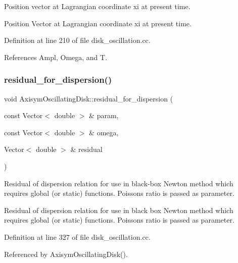 Position vector at Lagrangian coordinate xi at present time. 

Position Vector at Lagrangian coordinate xi at present time. 

Definition at line 210 of file disk\+\_\+oscillation.\+cc.



References Ampl, Omega, and T.

\mbox{\label{classAxisymOscillatingDisk_ae6a90b479781b587bb8905e7bf2bba3b}} 
\subsubsection{\texorpdfstring{residual\+\_\+for\+\_\+dispersion()}{residual\_for\_dispersion()}}
{\footnotesize\ttfamily void Axisym\+Oscillating\+Disk\+::residual\+\_\+for\+\_\+dispersion (\begin{DoxyParamCaption}\item[{const Vector$<$ double $>$ \&}]{param,  }\item[{const Vector$<$ double $>$ \&}]{omega,  }\item[{Vector$<$ double $>$ \&}]{residual }\end{DoxyParamCaption})\hspace{0.3cm}{\ttfamily [static]}}



Residual of dispersion relation for use in black-\/box Newton method which requires global (or static) functions. Poisson\textquotesingle{}s ratio is passed as parameter. 

Residual of dispersion relation for use in black box Newton method which requires global (or static) functions. Poisson\textquotesingle{}s ratio is passed as parameter. 

Definition at line 327 of file disk\+\_\+oscillation.\+cc.



Referenced by Axisym\+Oscillating\+Disk().

\mbox{\label{classAxisymOscillatingDisk_a7b39985cb0658924472700f4383b53aa}} 
